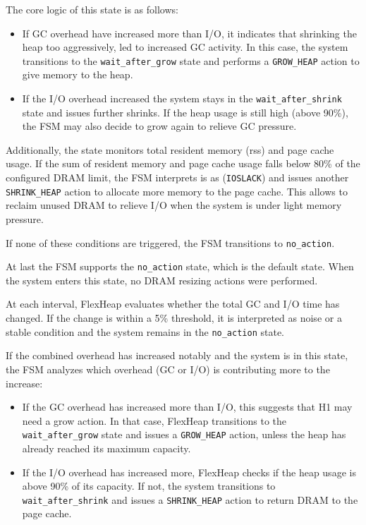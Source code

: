 The core logic of this state is as follows:
\begin{itemize}
  
  \item 
  If GC overhead have increased more than I/O, it indicates that shrinking the heap too aggressively,
  led to increased GC activity. In this case, the system transitions to the \texttt{wait\_after\_grow} state
  and performs a \texttt{GROW\_HEAP} action to give memory to the heap.
  
  \item If the I/O overhead increased the system stays in the \texttt{wait\_after\_shrink} state and issues further shrinks.
  If the heap usage is still high (above 90\%), the FSM may also decide to grow again to relieve GC pressure.
\end{itemize}

Additionally, the state monitors total resident memory (rss) and page cache usage.
If the sum of resident memory and page cache usage falls below 80\% 
of the configured DRAM limit, the FSM interprets is as (\texttt{IOSLACK}) and 
issues another \texttt{SHRINK\_HEAP} action to allocate more memory to the page cache. This allows 
to reclaim unused DRAM to relieve I/O when the system is under light memory pressure.

If none of these conditions are triggered, the FSM 
transitions to \texttt{no\_action}.

At last the FSM supports the \texttt{no\_action} state, which is the default state.
When the system enters this state, no DRAM resizing actions were performed.

At each interval, FlexHeap evaluates whether the total GC and I/O time has
changed. If the change is within a 5\% threshold, it is interpreted 
as noise or a stable condition and the system remains in the \texttt{no\_action} state.

If the combined overhead has increased notably and the system is in this state, the FSM analyzes which overhead (GC or I/O) is 
contributing more to the increase:
\begin{itemize}
  \item If the GC overhead has increased more than I/O, this suggests that H1 may need a grow action. 
  In that case, FlexHeap transitions to the \texttt{wait\_after\_grow} state and issues a \texttt{GROW\_HEAP} action, 
  unless the heap has already reached its maximum capacity.

  \item If the I/O overhead has increased more, FlexHeap checks if the heap usage is above 90\% of 
  its capacity. If not, the system transitions to \texttt{wait\_after\_shrink} and issues a \texttt{SHRINK\_HEAP} 
  action to return DRAM to the page cache.
\end{itemize}


